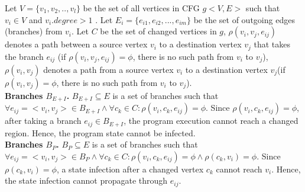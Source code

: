 Let $V=\{v_1,v_2,..,v_l\}$ be the set of all vertices in CFG $g<V, E>$ such that $ v_i \in V$ and $v_i.degree >1$ . Let $E_i = \{e_{i1}, e_{i2},...,e_{im}\}$ be the set of outgoing edges (branches) from $v_i$. Let $C$ be the set of changed vertices in $g$, $\rho(v_i, v_j, e_{ij})$ denotes a path between a source vertex $v_i$ to a destination vertex $v_j$ that takes the branch $e_{ij}$ (if $\rho(v_i, v_j, e_{ij}) =\phi$, there is no such path from $v_i$ to $v_j$), $\rho(v_i, v_j)$ denotes a path from a source vertex $v_i$ to a 
destination vertex $v_j$(if $\rho(v_i, v_j)=\phi$, there is no such path from $v_i$ to $v_j$).
\\ \textbf{Branches $B_{E+I}$.} 
$B_{E+I} \subseteq E$ is a set of branches such that $\forall e_{ij} = <v_i, v_j> \in B_{E+I} 
\wedge \forall c_k\in C: \rho(v_i, c_k, e_{ij}) = \phi$. 
Since $\rho(v_i, c_k, e_{ij}) = \phi$, after taking a branch $e_{ij} \in  B_{E+I}$, the
program execution cannot reach a changed region. Hence, the program state cannot be infected. 
\\ \textbf{Branches $B_P$. }
$B_{P} \subseteq E$ is a set of branches such that $\forall e_{ij} = <v_i, v_j> \in B_{P} 
\wedge \forall c_k\in C: \rho(v_i, c_k, e_{ij}) = \phi \wedge \rho(c_k, v_i) = \phi$. 
Since $\rho(c_k, v_i) = \phi$, a state infection after a changed vertex $c_k$ cannot reach $v_i$. 
Hence, the state infection cannot propagate through $e_{ij}$.



